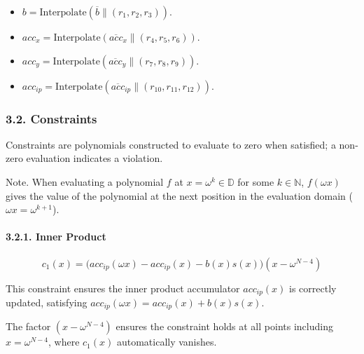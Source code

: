 \documentclass[
]{article}
\providecommand{\tightlist}{%
  \setlength{\itemsep}{0pt}\setlength{\parskip}{0pt}}
\begin{document}
\begin{itemize}
\tightlist
\item
  \(b = \text{Interpolate}(\overline{b} \| (r_1, r_2, r_3))\).
\item
  \(acc_x = \text{Interpolate}(\overline{acc}_x \| (r_4, r_5, r_6))\).
\item
  \(acc_y = \text{Interpolate}(\overline{acc}_y \| (r_7, r_8, r_9))\).
\item
  \(acc_{ip} = \text{Interpolate}(\overline{acc}_{ip} \| (r_{10}, r_{11}, r_{12}))\).
\end{itemize}

\hypertarget{constraints}{%
\subsubsection{3.2. Constraints}\label{constraints}}

Constraints are polynomials constructed to evaluate to zero when
satisfied; a non-zero evaluation indicates a violation.

Note. When evaluating a polynomial \(f\) at
\(x = \omega^k \in \mathbb{D}\) for some \(k \in \mathbb{N}\),
\(f(\omega x)\) gives the value of the polynomial at the next position
in the evaluation domain (\(\omega x = \omega^{k+1}\)).

\hypertarget{inner-product}{%
\paragraph{3.2.1. Inner Product}\label{inner-product}}

\[
c_1(x) = \bigl(acc_{ip}(\omega x) - acc_{ip}(x) - b(x)s(x)\bigr)(x - \omega^{N-4})
\]

This constraint ensures the inner product accumulator \(acc_{ip}(x)\) is
correctly updated, satisfying
\(acc_{ip}(\omega x) = acc_{ip}(x) + b(x)s(x)\).

The factor \((x - \omega^{N-4})\) ensures the constraint holds at all
points including \(x = \omega^{N-4}\), where \(c_1(x)\) automatically
vanishes.
\end{document}

